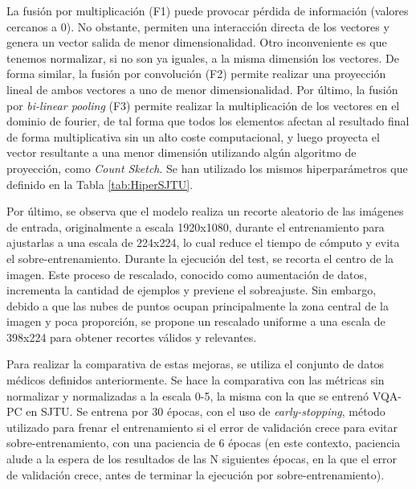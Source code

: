 La fusión por multiplicación (F1) puede provocar pérdida de información (valores cercanos a 0). 
No obstante, permiten una interacción directa de los vectores y genera un vector salida 
de menor dimensionalidad. Otro inconveniente es que tenemos normalizar, si no son 
ya iguales, a la misma dimensión los vectores. De forma similar, la fusión por convolución (F2)
permite realizar una proyección lineal de ambos vectores a uno de menor dimensionalidad. 
Por último, la fusión por \emph{bi-linear pooling} (F3) permite realizar la multiplicación de 
los vectores en el dominio de fourier, de tal forma que todos los elementos afectan al 
resultado final de forma multiplicativa sin un alto coste computacional, y luego proyecta 
el vector resultante a una menor dimensión utilizando algún algoritmo de proyección, 
como \emph{Count Sketch}. Se han utilizado los mismos hiperparámetros que definido 
en la Tabla \ref{tab:HiperSJTU}.

Por último, se observa que el modelo realiza un recorte aleatorio de las imágenes de entrada, 
originalmente a escala 1920x1080, durante el entrenamiento 
para ajustarlas a una escala de 224x224, lo cual reduce el tiempo de cómputo y 
evita el sobre-entrenamiento. Durante la ejecución del test, se recorta el centro de la imagen. 
Este proceso de rescalado, conocido como aumentación de datos, incrementa la cantidad de ejemplos 
y previene el sobreajuste. Sin embargo, debido a que las nubes de puntos ocupan principalmente 
la zona central de la imagen y poca proporción, se propone un rescalado uniforme a una escala de 
398x224 para obtener recortes válidos y relevantes.

Para realizar la comparativa de estas mejoras, se utiliza el conjunto de datos 
médicos definidos anteriormente. Se hace la comparativa con las métricas sin 
normalizar y normalizadas a la escala 0-5, la misma con la que se entrenó VQA-PC\cite{VQA-PC} en SJTU\cite{SJTU}. 
Se entrena por 30 épocas, con el uso de \emph{early-stopping}, método utilizado para frenar el entrenamiento 
si el error de validación crece para evitar sobre-entrenamiento, con una paciencia 
de 6 épocas (en este contexto, paciencia alude a la espera de los resultados de 
las N siguientes épocas, en la que el error de validación crece, antes de terminar 
la ejecución por sobre-entrenamiento). 

